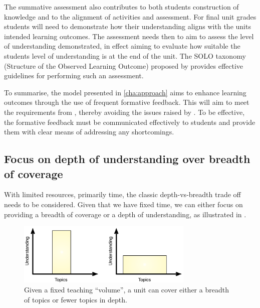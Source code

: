 The summative assessment also contributes to both students construction of knowledge and to the alignment of activities and assessment. For final unit grades students will need to demonstrate how their understanding aligns with the units intended learning outcomes. The assessment needs then to aim to assess the level of understanding demonstrated, in effect aiming to evaluate how suitable the students level of understanding is at the end of the unit. The SOLO taxonomy (Structure of the Observed Learning Outcome) proposed by \citet{Biggs:1982} provides effective guidelines for performing such an assessment.

To summarise, the model presented in \cref{cha:approach} aims to enhance learning outcomes through the use of frequent formative feedback. This will aim to meet the requirements from \citet{Gibbs:2004}, thereby avoiding the issues raised by \citet{Smith:2005}. To be effective, the formative feedback must be communicated effectively to students and provide them with clear means of addressing any shortcomings.


\subsection{Focus on depth of understanding over breadth of coverage} %
\label{ssub:focus_on_depth_of_understanding_over_breadth_of_coverage_}

With limited resources, primarily time, the classic depth-vs-breadth trade off needs to be considered. Given that we have fixed time, we can either focus on providing a breadth of coverage or a depth of understanding, as illustrated in . 

\begin{figure}[htbp]
	\centering
	\includegraphics[width=0.75\textwidth]{DepthOrBreadth}
	\caption{Given a fixed teaching ``volume'', a unit can cover either a breadth of topics or fewer topics in depth.}
	\label{fig:depth}
\end{figure}

